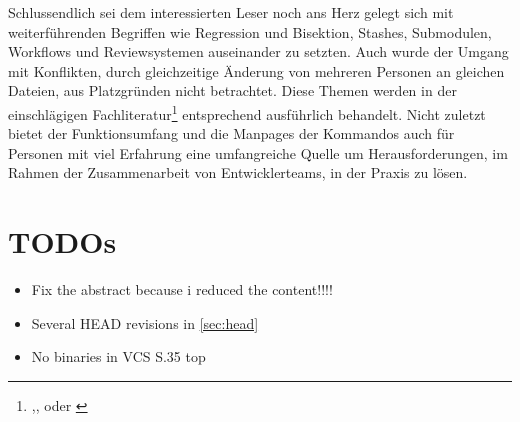 Schlussendlich sei dem interessierten Leser noch ans Herz gelegt sich mit
weiterführenden Begriffen wie Regression und Bisektion, Stashes, Submodulen,
Workflows und Reviewsystemen auseinander zu setzten. Auch wurde der Umgang mit
Konflikten, durch gleichzeitige Änderung von mehreren Personen an gleichen
Dateien, aus Platzgründen nicht betrachtet. Diese Themen werden in der
einschlägigen Fachliteratur\footnote{\cite{gitosp},\cite{progit},\cite{gitwf}
oder \cite{cd}} entsprechend ausführlich behandelt. Nicht zuletzt bietet der
Funktionsumfang und die Manpages der Kommandos auch für Personen mit viel
Erfahrung eine umfangreiche Quelle um Herausforderungen, im Rahmen der
Zusammenarbeit von Entwicklerteams, in der Praxis zu lösen.

\chapter{TODOs}
\begin{itemize}
\item Fix the abstract because i reduced the content!!!!
\item Several HEAD revisions in \ref{sec:head}
\item No binaries in VCS S.35 top
\end{itemize}
